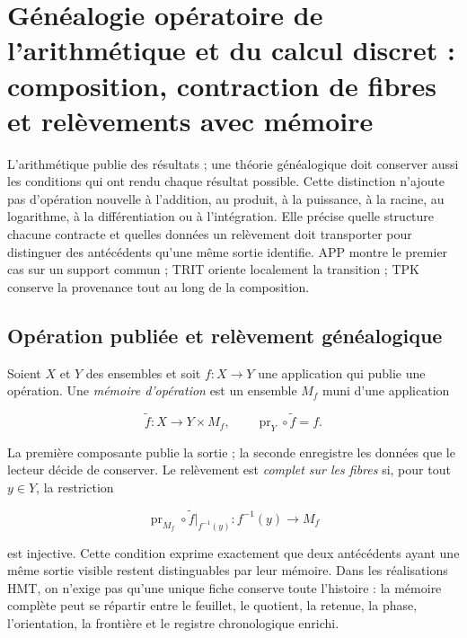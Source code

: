 
\chapter[Arithmétique, calcul discret et mémoire généalogique]{Généalogie
opératoire de l'arithmétique et du calcul discret : composition, contraction
de fibres et relèvements avec mémoire}
\label{chap:genealogia-operaciones-rev2}

L'arithmétique publie des résultats ; une théorie généalogique doit conserver
aussi les conditions qui ont rendu chaque résultat possible. Cette distinction
n'ajoute pas d'opération nouvelle à l'addition, au produit, à la puissance, à la racine, au
logarithme, à la différentiation ou à l'intégration. Elle précise quelle structure
chacune contracte et quelles données un relèvement doit transporter pour distinguer
des antécédents qu'une même sortie identifie. APP montre le premier cas sur
un support commun ; TRIT oriente localement la transition ; TPK conserve la
provenance tout au long de la composition.

\section{Opération publiée et relèvement généalogique}

Soient \(X\) et \(Y\) des ensembles et soit \(f:X\to Y\) une application qui publie
une opération. Une \emph{mémoire d'opération} est un ensemble \(M_f\) muni
d'une application

\begin{equation}
 \widetilde f:X\longrightarrow Y\times M_f,
 \qquad
 \operatorname{pr}_Y\circ\widetilde f=f.
 \label{eq:levantamiento-genealogico-operacion-rev2}
\end{equation}

La première composante publie la sortie ; la seconde enregistre les données que le
lecteur décide de conserver. Le relèvement est \emph{complet sur les fibres}
si, pour tout \(y\in Y\), la restriction

\[
 \operatorname{pr}_{M_f}\circ\widetilde f\big|_{f^{-1}(y)}
 :f^{-1}(y)\longrightarrow M_f
\]

est injective. Cette condition exprime exactement que deux antécédents
ayant une même sortie visible restent distinguables par leur mémoire. Dans les
réalisations HMT, on n'exige pas qu'une unique fiche conserve toute l'histoire :
la mémoire complète peut se répartir entre le feuillet, le quotient, la retenue, la phase,
l'orientation, la frontière et le registre chronologique enrichi.

